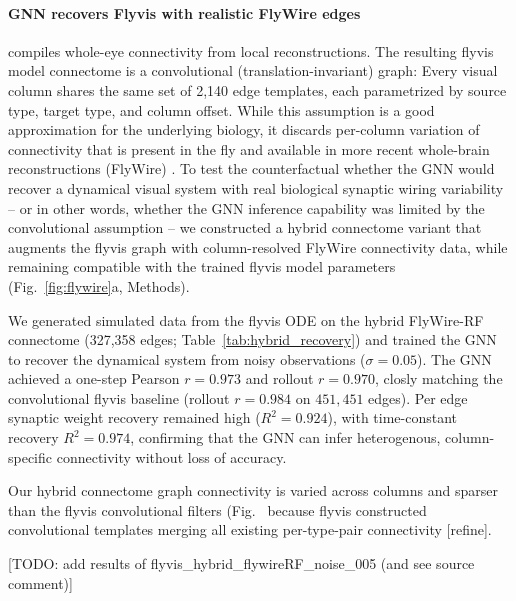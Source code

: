 \documentclass{article}
\begin{document}
\paragraph{GNN recovers Flyvis with realistic FlyWire edges}
\cite{lappalainen_connectome-constrained_2024} compiles whole-eye connectivity from local reconstructions. The resulting flyvis model connectome is a convolutional (translation-invariant) graph: Every visual column shares the same set of 2,140 edge templates, each parametrized by source type, target type, and column offset. While this assumption is a good approximation for the underlying biology, it discards per-column variation of connectivity that is present in the fly and available in more recent whole-brain reconstructions (FlyWire) \citep{dorkenwald_neuronal_2024, Schlegel2024-qh}. To test the counterfactual whether the GNN would recover a dynamical visual system with real biological synaptic wiring variability -- or in other words, whether the GNN inference capability was limited by the convolutional assumption --  we constructed a hybrid connectome variant that augments the flyvis graph with column-resolved FlyWire connectivity data, while remaining compatible with the trained flyvis model parameters (Fig.~\ref{fig:flywire}a, Methods). 

We generated simulated data from the flyvis ODE on the hybrid FlyWire-RF connectome (327,358
edges; Table~\ref{tab:hybrid_recovery}) and trained the GNN to recover the dynamical system from noisy observations ($\sigma=0.05$). The GNN achieved a one-step Pearson $r=0.973$ and rollout $r=0.970$, closly matching the convolutional flyvis baseline (rollout $r=0.984$ on $451,451$ edges). Per edge synaptic weight recovery remained high ($R^2=0.924$), with time-constant recovery $R^2=0.974$, confirming that the GNN can infer heterogenous, column-specific connectivity without loss of accuracy.

Our hybrid connectome graph connectivity is varied across columns and sparser than the flyvis convolutional filters (Fig.~ because flyvis constructed convolutional templates merging all existing per-type-pair connectivity [refine].


[TODO: add results of flyvis\_hybrid\_flywireRF\_noise\_005 (and see source comment)]
\end{document}
